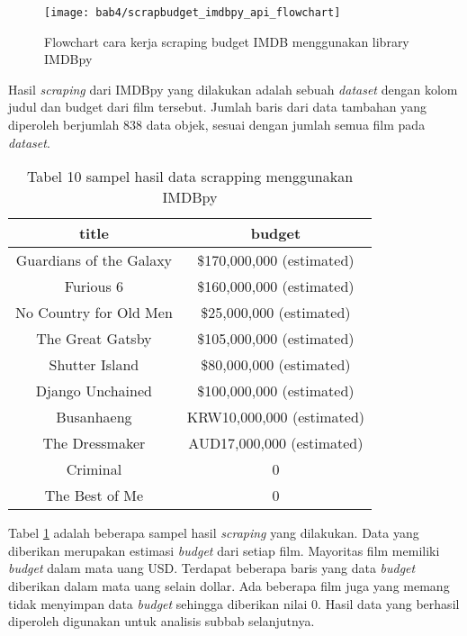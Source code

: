 \begin{figure}[H]
	\centering  
	\texttt{[image: bab4/scrapbudget\_imdbpy\_api\_flowchart]}   
	\caption{Flowchart cara kerja scraping budget IMDB menggunakan library IMDBpy}
	\label{fig:scrapbudget_imdbpy_api_flowchart} 
\end{figure} 

Hasil \textit{scraping} dari IMDBpy yang dilakukan adalah sebuah \textit{dataset} dengan kolom judul dan budget dari film tersebut. Jumlah baris dari data tambahan yang diperoleh berjumlah 838 data objek, sesuai dengan jumlah semua film pada \textit{dataset}.

\begin{table}[H]
\caption{Tabel 10 sampel hasil data scrapping menggunakan IMDBpy}
\centering
\begin{tabular}{|c|c|}
  \hline 
  title & budget \\ 
  \hline 
  Guardians of the Galaxy & \$170,000,000 (estimated) \\ 
  \hline 
  Furious 6 & \$160,000,000 (estimated) \\ 
  \hline 
  No Country for Old Men & \$25,000,000 (estimated) \\ 
  \hline 
  The Great Gatsby & \$105,000,000 (estimated) \\ 
  \hline 
  Shutter Island & \$80,000,000 (estimated) \\ 
  \hline 
  Django Unchained & \$100,000,000 (estimated) \\ 
  \hline 
  Busanhaeng & KRW10,000,000 (estimated) \\ 
  \hline 
  The Dressmaker & AUD17,000,000 (estimated) \\ 
  \hline 
  Criminal & 0 \\ 
  \hline 
  The Best of Me & 0 \\ 
  \hline 
  \end{tabular}   
  \label{tab:10sampelhasilscrap_imdbpy_api}
\end{table}

Tabel \ref{tab:10sampelhasilscrap_imdbpy_api} adalah beberapa sampel hasil \textit{scraping} yang dilakukan. Data yang diberikan merupakan estimasi \textit{budget} dari setiap film. Mayoritas film memiliki \textit{budget} dalam mata uang USD. Terdapat beberapa baris yang data \textit{budget} diberikan dalam mata uang selain dollar. Ada beberapa film juga yang memang tidak menyimpan data \textit{budget} sehingga diberikan nilai $0$. Hasil data yang berhasil diperoleh digunakan untuk analisis subbab selanjutnya. 



